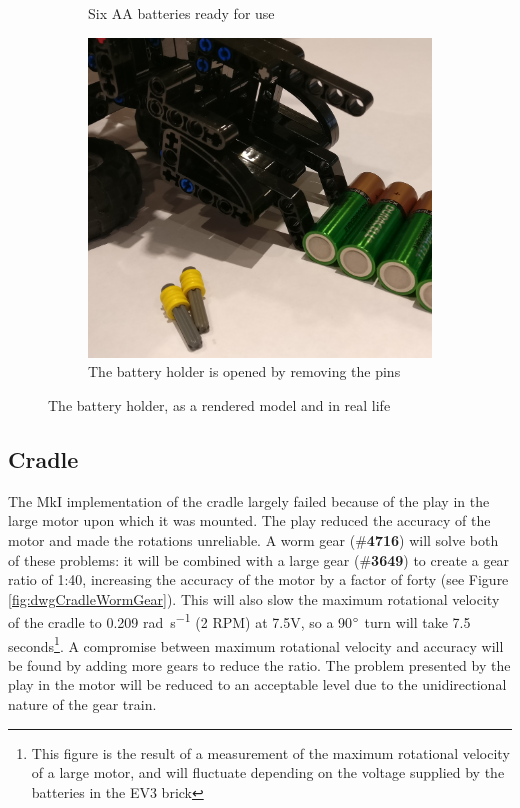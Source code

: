 \documentclass{report}
\newcommand{\tbo}[1]{\textbf{#1}}
\newcommand{\legopiece}[1]{(\#\tbo{#1})}
\begin{document}
\begin{figure}[H]
\begin{subfigure}[b]{0.21082\textwidth}
			\caption{Six AA batteries ready for use}
			\label{fig:imgBatteryHolder}
		\end{subfigure}
		\hspace{10mm}
		\begin{subfigure}[b]{0.26253\textwidth}
			\includegraphics[width=\textwidth]{Resources/Images/imgBatteryHolderOpen.jpg}
			\caption{The battery holder is opened by removing the pins}
			\label{fig:imgBatteryHolderOpen}
		\end{subfigure}
		\caption{The battery holder, as a rendered model and in real life}
		\label{fig:batteryHolder}
	\end{figure}
	
	\subsection{Cradle}

	The MkI implementation of the cradle largely failed because of the play in the large motor upon which it was mounted. The play reduced the accuracy of the motor and made the rotations unreliable. A worm gear \legopiece{4716} will solve both of these problems: it will be combined with a large gear \legopiece{3649} to create a gear ratio of 1:40, increasing the accuracy of the motor by a factor of forty (see Figure \ref{fig:dwgCradleWormGear}). This will also slow the maximum rotational velocity of the cradle to 0.209 \si{\radian\per\second} (2 RPM) at 7.5V, so a 90$\degree$ turn will take 7.5 seconds\footnote{This figure is the result of a measurement of the maximum rotational velocity of a large motor, and will fluctuate depending on the voltage supplied by the batteries in the EV3 brick}. A compromise between maximum rotational velocity and accuracy will be found by adding more gears to reduce the ratio. The problem presented by the play in the motor will be reduced to an acceptable level due to the unidirectional nature of the gear train.
	
\end{document}
